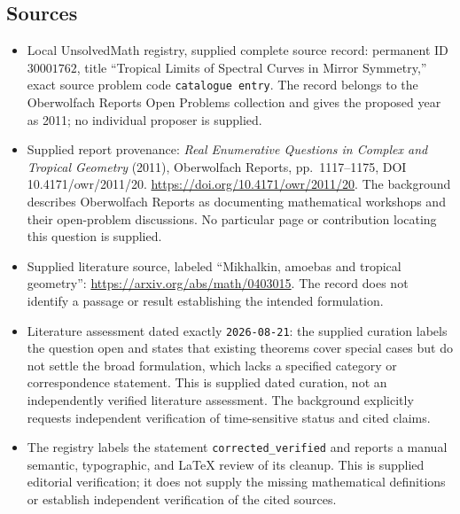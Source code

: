 \documentclass[11pt]{article}
\begin{document}
\subsection{Sources}
\begin{itemize}
\item Local UnsolvedMath registry, supplied complete source record: permanent ID \(30001762\), title ``Tropical Limits of Spectral Curves in Mirror Symmetry,'' exact source problem code \texttt{catalogue entry}. The record belongs to the Oberwolfach Reports Open Problems collection and gives the proposed year as 2011; no individual proposer is supplied.
\item Supplied report provenance: \emph{Real Enumerative Questions in Complex and Tropical Geometry} (2011), Oberwolfach Reports, pp.~1117--1175, DOI 10.4171/owr/2011/20. \url{https://doi.org/10.4171/owr/2011/20}. The background describes Oberwolfach Reports as documenting mathematical workshops and their open-problem discussions. No particular page or contribution locating this question is supplied.
\item Supplied literature source, labeled ``Mikhalkin, amoebas and tropical geometry'': \url{https://arxiv.org/abs/math/0403015}. The record does not identify a passage or result establishing the intended formulation.
\item Literature assessment dated exactly \texttt{2026-08-21}: the supplied curation labels the question open and states that existing theorems cover special cases but do not settle the broad formulation, which lacks a specified category or correspondence statement. This is supplied dated curation, not an independently verified literature assessment. The background explicitly requests independent verification of time-sensitive status and cited claims.
\item The registry labels the statement \texttt{corrected\_verified} and reports a manual semantic, typographic, and LaTeX review of its cleanup. This is supplied editorial verification; it does not supply the missing mathematical definitions or establish independent verification of the cited sources.
\end{itemize}
\end{document}
